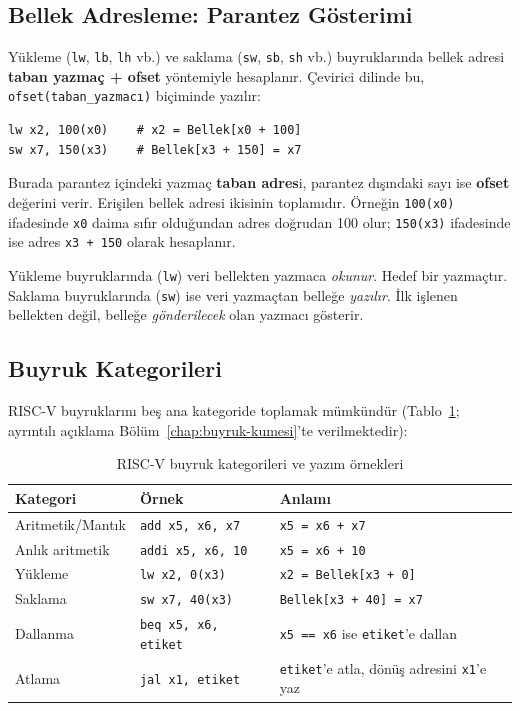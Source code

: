 \subsection{Bellek Adresleme: Parantez Gösterimi}

Yükleme (\texttt{lw}, \texttt{lb}, \texttt{lh} vb.) ve saklama (\texttt{sw}, \texttt{sb}, \texttt{sh} vb.) buyruklarında bellek adresi \textbf{taban yazmaç + ofset} yöntemiyle hesaplanır. Çevirici dilinde bu, \texttt{ofset(taban\_yazmacı)} biçiminde yazılır:

\begin{lstlisting}[style=riscv, style=alistirma-kod]
lw x2, 100(x0)    # x2 = Bellek[x0 + 100]
sw x7, 150(x3)    # Bellek[x3 + 150] = x7
\end{lstlisting}

Burada parantez içindeki yazmaç \textbf{taban adres}i, parantez dışındaki sayı ise \textbf{ofset} değerini verir. Erişilen bellek adresi ikisinin toplamıdır. Örneğin \texttt{100(x0)} ifadesinde \texttt{x0} daima sıfır olduğundan adres doğrudan 100 olur; \texttt{150(x3)} ifadesinde ise adres \texttt{x3 + 150} olarak hesaplanır.

\begin{bilginot}
Yükleme buyruklarında (\texttt{lw}) veri bellekten yazmaca \emph{okunur}. Hedef bir yazmaçtır. Saklama buyruklarında (\texttt{sw}) ise veri yazmaçtan belleğe \emph{yazılır}. İlk işlenen bellekten değil, belleğe \emph{gönderilecek} olan yazmacı gösterir.
\end{bilginot}

\subsection{Buyruk Kategorileri}

RISC-V buyruklarını beş ana kategoride toplamak mümkündür (Tablo~\ref{tab:ekc-buyruk-kategorileri}; ayrıntılı açıklama Bölüm~\ref{chap:buyruk-kumesi}'te verilmektedir):

\begin{table}[H]
\centering
\caption{RISC-V buyruk kategorileri ve yazım örnekleri}
\label{tab:ekc-buyruk-kategorileri}
\begin{tabular}{lll}
\toprule
\textbf{Kategori} & \textbf{Örnek} & \textbf{Anlamı} \\
\midrule
Aritmetik/Mantık & \texttt{add x5, x6, x7} & \texttt{x5 = x6 + x7} \\
Anlık aritmetik  & \texttt{addi x5, x6, 10} & \texttt{x5 = x6 + 10} \\
Yükleme          & \texttt{lw x2, 0(x3)} & \texttt{x2 = Bellek[x3 + 0]} \\
Saklama          & \texttt{sw x7, 40(x3)} & \texttt{Bellek[x3 + 40] = x7} \\
Dallanma         & \texttt{beq x5, x6, etiket} & \texttt{x5 == x6} ise \texttt{etiket}'e dallan \\
Atlama           & \texttt{jal x1, etiket} & \texttt{etiket}'e atla, dönüş adresini \texttt{x1}'e yaz \\
\bottomrule
\end{tabular}
\end{table}

